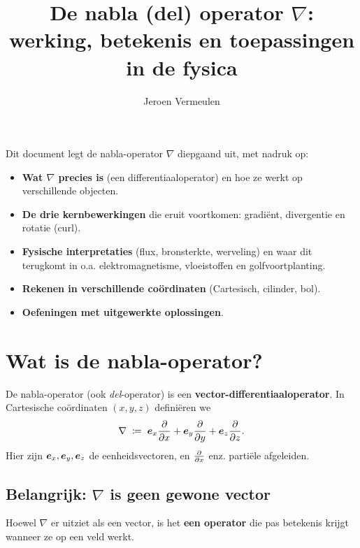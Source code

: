 \documentclass[11pt,a4paper]{article}
\title{De nabla (del) operator \texorpdfstring{$\nabla$}{∇}: werking, betekenis en toepassingen in de fysica}
\author{Jeroen Vermeulen}
\date{}
\begin{document}
    \maketitle

    \begin{tcolorbox}[colback=gray!6,colframe=gray!40,title=Doel van dit document]
        Dit document legt de nabla-operator \(\nabla\) diepgaand uit, met nadruk op:
        \begin{itemize}
            \item \textbf{Wat \(\nabla\) precies is} (een differentiaaloperator) en hoe ze werkt op verschillende objecten.
            \item \textbf{De drie kernbewerkingen} die eruit voortkomen: gradi\"ent, divergentie en rotatie (curl).
            \item \textbf{Fysische interpretaties} (flux, bronsterkte, werveling) en waar dit terugkomt in o.a. elektromagnetisme, vloeistoffen en golfvoortplanting.
            \item \textbf{Rekenen in verschillende co\"ordinaten} (Cartesisch, cilinder, bol).
            \item \textbf{Oefeningen met uitgewerkte oplossingen}.
        \end{itemize}
    \end{tcolorbox}

    \tableofcontents
    \newpage



    \section{Wat is de nabla-operator?}
    De nabla-operator (ook \emph{del}-operator) is een \textbf{vector-differentiaaloperator}. In Cartesische co\"ordinaten \((x,y,z)\) defini\"eren we
    \begin{equation}
        \nabla \;\coloneqq\; \vb*{e}_x \pdv{}{x} + \vb*{e}_y \pdv{}{y} + \vb*{e}_z \pdv{}{z}.
    \end{equation}
    Hier zijn \(\vb*{e}_x,\vb*{e}_y,\vb*{e}_z\) de eenheidsvectoren, en \(\pdv{}{x}\) enz. partiële afgeleiden.

    \subsection{Belangrijk: \(\nabla\) is geen gewone vector}
    Hoewel \(\nabla\) er uitziet als een vector, is het \textbf{een operator} die pas betekenis krijgt wanneer ze op een veld werkt.
\end{document}
